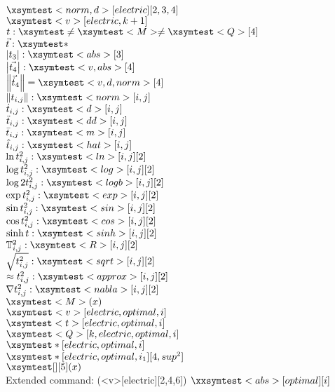 \documentclass{article}
\def\indcurrentstep{k}
\begin{document}
$\xsymtest<norm,d>[electric][2,3,4]$\\
$\xsymtest<v>[electric,\indcurrentstep+1]$\\
$t:\xsymtest\neq\xsymtest<M>\neq\xsymtest<Q>[4]$\\
$\vec{t}:\xsymtest*$\\
$\left|t_3\right|:\xsymtest<abs>[3]$\\
$\left|\vec{t_4}\right|:\xsymtest<v,abs>[4]$\\
$\left\|\vec{\dot{t}}_4\right\|=\xsymtest<v,d,norm>[4]$\\
$\left\|t_{i,j}\right\|:\xsymtest<norm>[i,j]$\\
$\dot{t}_{i,j}:\xsymtest<d>[i,j]$\\
$\ddot{t}_{i,j}:\xsymtest<dd>[i,j]$\\
$\bar{t}_{i,j}:\xsymtest<m>[i,j]$\\
$\hat{t}_{i,j}:\xsymtest<hat>[i,j]$\\
$\ln t_{i,j}^{2}:\xsymtest<ln>[i,j][2]$\\
$\log t_{i,j}^{2}:\xsymtest<log>[i,j][2]$\\
$\log2 t_{i,j}^{2}:\xsymtest<logb>[i,j][2]$\\
$\exp t_{i,j}^{2}:\xsymtest<exp>[i,j][2]$\\
$\sin t_{i,j}^{2}:\xsymtest<sin>[i,j][2]$\\
$\cos t_{i,j}^{2}:\xsymtest<cos>[i,j][2]$\\
$\sinh t:\xsymtest<sinh>[i,j][2]$\\
$\mathbb{\uppercase{t}}_{i,j}^{2}:\xsymtest<R>[i,j][2]$\\
$\sqrt{t_{i,j}^{2}}:\xsymtest<sqrt>[i,j][2]$\\
$\approx t_{i,j}^{2}:\xsymtest<approx>[i,j][2]$\\
$\nabla t_{i,j}^{2}:\xsymtest<nabla>[i,j][2]$\\
$\xsymtest<M>(x)$\\ %
$\xsymtest<v>[electric,optimal,i]$\\ %
$\xsymtest<t>[electric,optimal,i]$\\ %
$\xsymtest<Q>[k,electric,optimal,i]$\\ %
$\xsymtest*[electric,optimal,i]$\\
$\xsymtest*[electric,optimal,i_1][4,sup^2]$\\ %
$\xsymtest[][5](x)$\\

Extended command:
\newxsym(\xsymtest<v>[electric][2,4,6]){\xxsymtest} %
$\xxsymtest<abs>[optimal][i]$\\
\end{document}
